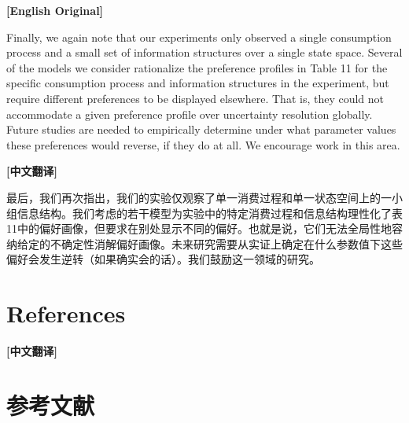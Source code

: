 \documentclass[12pt,a4paper]{ctexart}
\newenvironment{original}{%
  \par\medskip\noindent\textbf{[English Original]}\par\smallskip
  \color{black}\small
}{%
  \par\medskip
}
\newenvironment{translation}{%
  \par\noindent\textbf{[中文翻译]}\par\smallskip
  \color{blue}\small
}{%
  \par\bigskip
}
\theoremstyle{definition}
\theoremstyle{remark}
\begin{document}
\begin{original}
Finally, we again note that our experiments only observed a single consumption process and a small set of information structures over a single state space. Several of the models we consider rationalize the preference profiles in Table 11 for the specific consumption process and information structures in the experiment, but require different preferences to be displayed elsewhere. That is, they could not accommodate a given preference profile over uncertainty resolution globally. Future studies are needed to empirically determine under what parameter values these preferences would reverse, if they do at all. We encourage work in this area.
\end{original}
\begin{translation}
最后，我们再次指出，我们的实验仅观察了单一消费过程和单一状态空间上的一小组信息结构。我们考虑的若干模型为实验中的特定消费过程和信息结构理性化了表11中的偏好画像，但要求在别处显示不同的偏好。也就是说，它们无法全局性地容纳给定的不确定性消解偏好画像。未来研究需要从实证上确定在什么参数值下这些偏好会发生逆转（如果确实会的话）。我们鼓励这一领域的研究。
\end{translation}

\newpage

\section*{References}
\begin{translation}
\section*{参考文献}
\end{translation}
\end{document}
